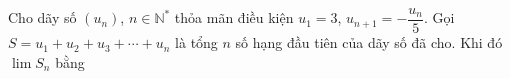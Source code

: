 \begin{ex}
Cho dãy số $(u_n)$, $n\in\mathbb N^*$ thỏa mãn điều kiện $u_1=3$, $u_{n+1}=-\dfrac{u_n}5$. Gọi $S=u_1+u_2+u_3+\cdots+u_n$ là tổng $n$ số hạng đầu tiên của dãy số đã cho. Khi đó $\lim S_n$ bằng
\end{ex}
